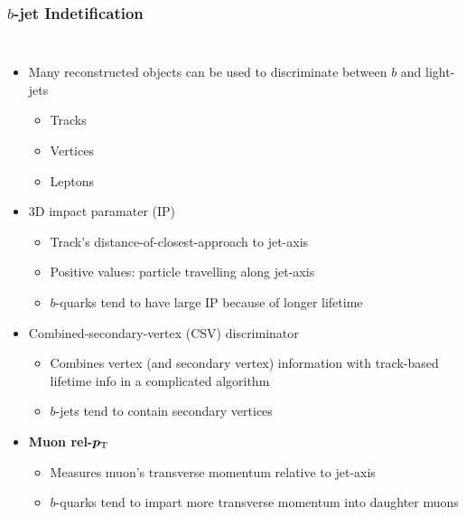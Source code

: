 \begin{frame}
  \frametitle{\textbf{$b$-jet Indetification}}
  \begin{columns}
    \begin{itemize}
    \item Many reconstructed objects can be used to discriminate between $b$ and light-jets
      \begin{itemize}
      \item Tracks
      \item Vertices
      \item Leptons
      \end{itemize}
    \item 3D impact paramater (IP)
      \begin{itemize}
      \item Track's distance-of-closest-approach to jet-axis
      \item Positive values: particle travelling along jet-axis
      \item $b$-quarks tend to have large IP because of longer lifetime
      \end{itemize}
    \item Combined-secondary-vertex (CSV) discriminator
      \begin{itemize}
      \item Combines vertex (and secondary vertex) information with track-based lifetime info in a complicated algorithm
      \item $b$-jets tend to contain secondary vertices
      \end{itemize}
    \item \textbf{Muon rel-}$\boldmath{p_{\text{T}}}$
      \begin{itemize}
      \item Measures muon's transverse momentum relative to jet-axis
      \item $b$-quarks tend to impart more transverse momentum into daughter muons
      \end{itemize}
    \end{itemize}
    \centering
  \end{columns}
\end{frame}
